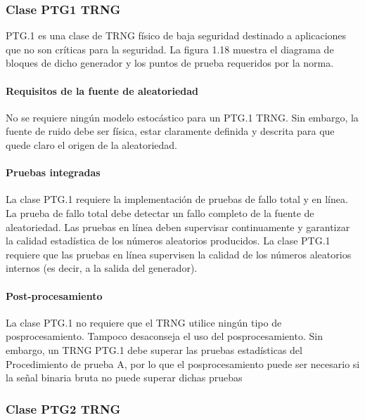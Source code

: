 	\subsubsection{Clase PTG1 TRNG}
		PTG.1 es una clase de TRNG físico de baja seguridad destinado a aplicaciones que no son críticas para la seguridad. La figura 1.18 muestra el diagrama de bloques de dicho generador y los puntos de prueba requeridos por la norma.
		
		\paragraph{Requisitos de la fuente de aleatoriedad\\}
		
		No se requiere ningún modelo estocástico para un PTG.1 TRNG. Sin embargo, la fuente de ruido debe ser física, estar claramente definida y descrita para que quede claro el origen de la aleatoriedad.
		
		\paragraph{Pruebas integradas\\}
		
		La clase PTG.1 requiere la implementación de pruebas de fallo total y en línea. La prueba de fallo total debe detectar un fallo completo de la fuente de aleatoriedad. Las pruebas en línea deben supervisar continuamente y garantizar la calidad estadística de los números aleatorios producidos. La clase PTG.1 requiere que las pruebas en línea supervisen la calidad de los números aleatorios internos (es decir, a la salida del generador).
		
		\paragraph{Post-procesamiento\\}
		
		La clase PTG.1 no requiere que el TRNG utilice ningún tipo de posprocesamiento. Tampoco desaconseja el uso del posprocesamiento. Sin embargo, un TRNG PTG.1 debe superar las pruebas estadísticas del Procedimiento de prueba A, por lo que el posprocesamiento puede ser necesario si la señal binaria bruta no puede superar dichas pruebas
		
	\subsubsection{Clase PTG2 TRNG}
	

